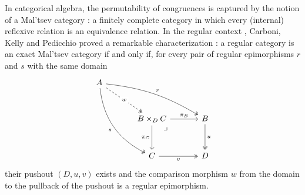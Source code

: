 \documentclass[11pt,a4paper]{article}
\theoremstyle{plain}
\theoremstyle{definition}
\theoremstyle{remark}
\theoremstyle{plain}
\begin{document}
In categorical algebra, the permutability of congruences is captured by the
notion of a Mal'tsev category
\cite{CLP, CPP}: a finitely complete category in which every (internal) reflexive
relation is an equivalence relation. In the regular context
\cite{Barr}, Carboni, Kelly and Pedicchio proved a remarkable
characterization \cite[Theorem~5.7]{CKP}: a regular category is an
exact Mal'tsev category if and only if, for every pair of regular
epimorphisms $r$ and $s$ with the same domain
\begin{equation}\label{pushout}
\begin{tikzcd}[column sep=3.4em, row sep=3em]
A
\arrow[drr, two heads, bend left=12, "r"]
\arrow[ddr, two heads, bend right=28, "s"']
\arrow[dr, two heads, dashed, "w" description] & & \\
& B \times_D C
\arrow[r, "\pi_B"]
\arrow[d, "\pi_C"']
\arrow[dr, phantom, pos=0.12, "\lrcorner"] &
B \arrow[d, two heads, "u"] \\
& C \arrow[r, two heads, "v"'] & D
\end{tikzcd}
\end{equation}
 their pushout $(D,u,v)$ exists and the comparison
morphism $w$ from the domain to the pullback of the pushout is a regular
epimorphism.
\end{document}
